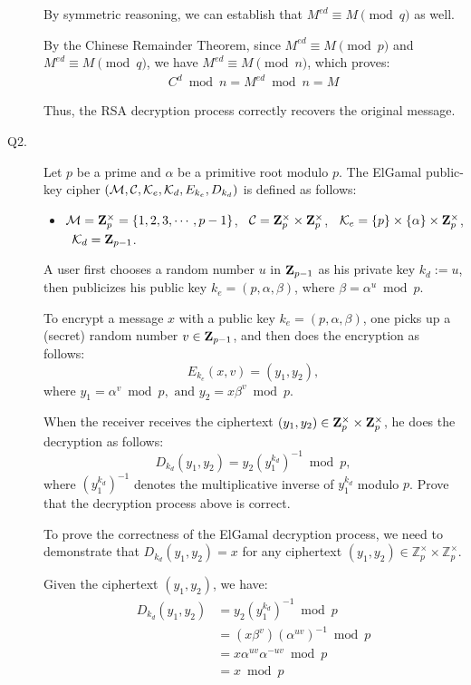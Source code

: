 \documentclass[11pt,epsfig]{article}
\newcommand{\cM}{{\cal M}}
\newcommand{\cC}{{\cal C}}
\newcommand{\cK}{{\cal K}}
\newcommand{\bZ}{{\bf Z}}
\begin{document}
\begin{description}
By symmetric reasoning, we can establish that $M^{ed} \equiv M \pmod{q}$ as well.

By the Chinese Remainder Theorem, since $M^{ed} \equiv M \pmod{p}$ and $M^{ed} \equiv M \pmod{q}$, we have $M^{ed} \equiv M \pmod{n}$, which proves:
\begin{align}
C^d \bmod{n} = M^{ed} \bmod{n} = M
\end{align}

Thus, the RSA decryption process correctly recovers the original message.


\item[Q2.] 
Let $p$ be a prime and $\alpha$ be a primitive root modulo $p$. The ElGamal public-key 
cipher $(\cM, \cC, \cK_e, \cK_d, E_{k_e}, D_{k_d})$ is defined as follows: 
\begin{itemize} 
\item $\cM = \bZ_p^\times=\{1,2,3, \cdots, p-1\}$, \ 
$\cC = \bZ_p^\times \times \bZ_p^\times$, \   
$\cK_e= \{p\} \times \{\alpha\} \times \bZ_p^\times$,  \ 
$\cK_d=\bZ_{p-1}$. 
\end{itemize} 
A user first chooses a random number $u$ in $\bZ_{p-1}$ as his private key $k_d:=u$, then   
publicizes his public key $k_e=(p, \alpha, \beta)$, where $\beta=\alpha^{u} \bmod{p}$. 

To encrypt a message $x$ with a public key $k_e=(p, \alpha, \beta)$, one picks up a  
(secret) random number $v \in \bZ_{p-1}$, and then does the encryption as follows: 
$$ 
E_{k_e}(x, v)=(y_1, y_2), 
$$ 
where 
$
y_1=\alpha^v \bmod{p}, \mbox{ and } y_2=x \beta^v \bmod{p}. 
$
  
When the receiver receives the ciphertext $(y_1, y_2) \in \bZ_p^\times \times \bZ_p^\times$, he does 
the decryption as follows:  
$$ 
D_{k_d}(y_1, y_2)=y_2 \left(y_1^{k_d} \right)^{-1} \bmod{p},  
$$   
where $\left(y_1^{k_d} \right)^{-1}$ denotes the multiplicative inverse of $y_1^{k_d}$ 
modulo $p$. Prove that the decryption process above is correct.  \hfill {}

\Paragraph{Solution.} To prove the correctness of the ElGamal decryption process, we need to demonstrate that $D_{k_d}(y_1, y_2) = x$ for any ciphertext $(y_1, y_2) \in \mathbb{Z}_p^\times \times \mathbb{Z}_p^\times$.

Given the ciphertext $(y_1, y_2)$, we have:
\begin{align}
D_{k_d}(y_1, y_2) &= y_2 \left(y_1^{k_d}\right)^{-1} \bmod{p}\\
&= (x\beta^v) \left(\alpha^{uv}\right)^{-1} \bmod{p}\\
&= x\alpha^{uv} \alpha^{-uv} \bmod{p}\\
&= x \bmod{p}
\end{align}




\end{description}
\end{document}
